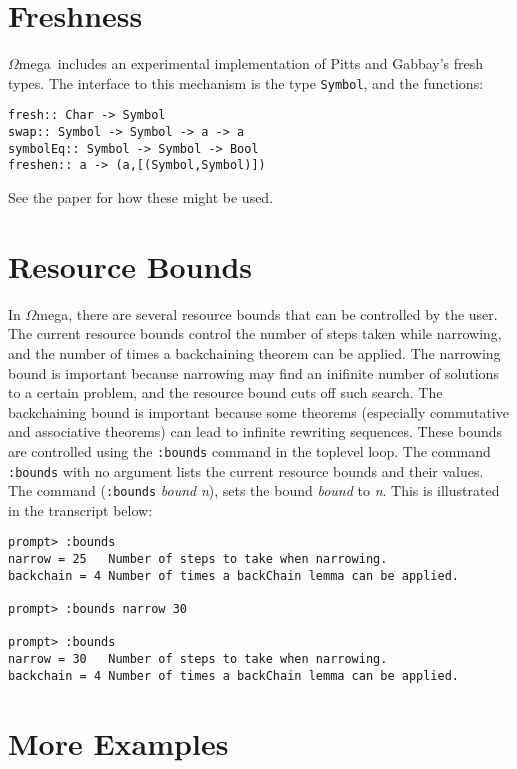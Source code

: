 \documentclass[11pt,twoside]{article}
\newcommand{\om}{$\Omega$mega}
\begin{document}
\section{Freshness} \label{fresh}

\om\ includes an experimental implementation of Pitts and Gabbay's
fresh types\cite{gabbay-pitts-02}. The interface to this mechanism
is the type {\tt Symbol}, and the functions:
\begin{verbatim}
fresh:: Char -> Symbol
swap:: Symbol -> Symbol -> a -> a
symbolEq:: Symbol -> Symbol -> Bool
freshen:: a -> (a,[(Symbol,Symbol)])
\end{verbatim}
See the paper for how these might be used.


\section{Resource Bounds}\label{bounds}

In \om, there are several resource bounds that can be controlled by
the user. The current resource bounds control the number of
steps taken while narrowing, and the number of times a backchaining
theorem can be applied. The narrowing bound is important
because narrowing may find an inifinite number of solutions
to a certain problem, and the resource bound cuts off such search.
The backchaining bound is important because some theorems
(especially commutative and associative theorems) can
lead to infinite rewriting sequences. These bounds are controlled
using the {\tt :bounds} command in the toplevel loop. The
command {\tt :bounds} with no argument lists the current resource bounds
and their values. The command ({\tt :bounds} {\it bound} {\it n}),
sets the bound {\it bound} to {\it n}. This is illustrated
in the transcript below:

\begin{verbatim}
prompt> :bounds
narrow = 25   Number of steps to take when narrowing.
backchain = 4 Number of times a backChain lemma can be applied.

prompt> :bounds narrow 30

prompt> :bounds
narrow = 30   Number of steps to take when narrowing.
backchain = 4 Number of times a backChain lemma can be applied.
\end{verbatim}

\section{More Examples}\label{examples}
\end{document}
